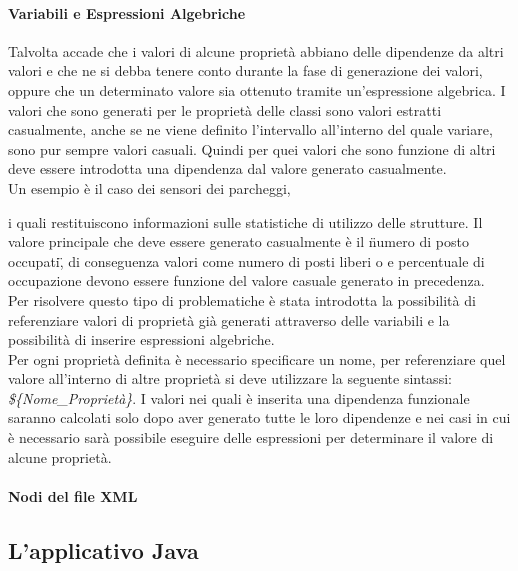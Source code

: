 \documentclass[12pt,a4paper,italian]{article}
\begin{document}
\paragraph{Variabili e Espressioni Algebriche}
Talvolta accade che i valori di alcune proprietà abbiano delle dipendenze da altri valori e che ne si debba tenere conto durante la fase di generazione dei valori, oppure che un 
determinato valore sia ottenuto tramite un'espressione algebrica.
I valori che sono generati per le proprietà delle classi sono valori estratti casualmente, anche se ne viene definito l'intervallo all'interno del quale variare, sono pur sempre valori casuali. 
Quindi per quei valori che sono funzione di altri deve essere introdotta una dipendenza dal valore generato casualmente.\\
Un esempio è il caso dei sensori dei parcheggi, 


i quali restituiscono informazioni sulle statistiche di utilizzo delle strutture. Il valore principale che deve essere 
generato casualmente è il \"numero di posto occupati\", di conseguenza valori come numero di posti liberi o e percentuale di occupazione devono essere funzione del valore
casuale generato in precedenza.\\
Per risolvere questo tipo di problematiche è stata introdotta la possibilità di referenziare valori di proprietà già generati attraverso delle variabili e la possibilità di 
inserire espressioni algebriche.\\
Per ogni proprietà definita è necessario specificare un nome, per referenziare quel valore all'interno di altre proprietà si deve utilizzare la seguente sintassi: \emph{\$\{Nome_Proprietà\}}.
I valori nei quali è inserita una dipendenza funzionale saranno calcolati solo dopo aver generato tutte le loro dipendenze e nei casi in cui è necessario sarà possibile eseguire delle espressioni 
per determinare il valore di alcune proprietà.

 
\paragraph{Nodi del file XML}
 
\subsection{L'applicativo Java}
\end{document}

